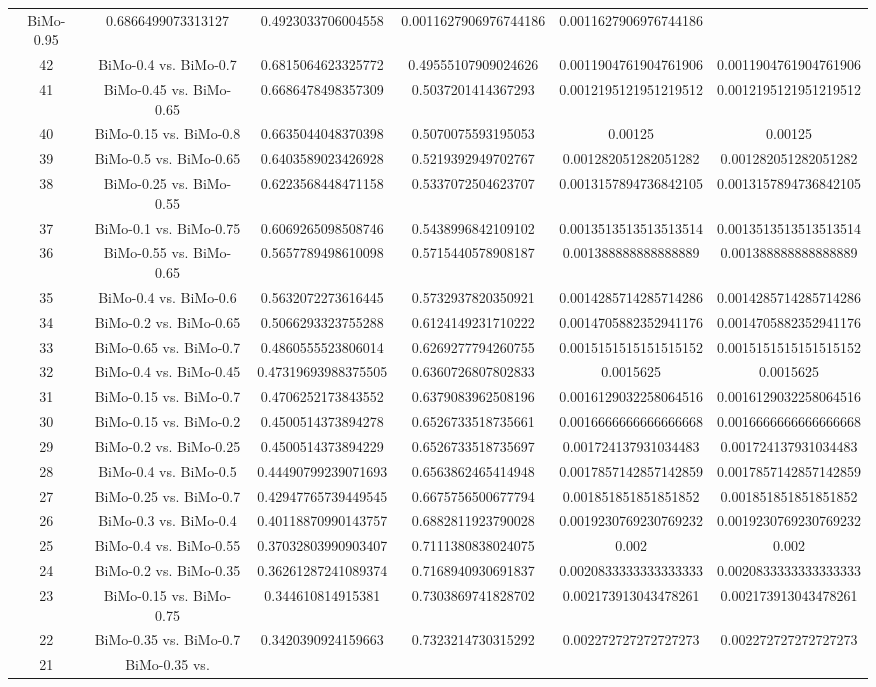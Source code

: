 \documentclass[a4paper,10pt]{article}
\begin{document}
\begin{landscape}
\begin{table}[!htp]
\begin{tabular}{cccccc}
BiMo-0.95&0.6866499073313127&0.4923033706004558&0.0011627906976744186&0.0011627906976744186\\42&BiMo-0.4 vs. BiMo-0.7&0.6815064623325772&0.49555107909024626&0.0011904761904761906&0.0011904761904761906\\41&BiMo-0.45 vs. BiMo-0.65&0.6686478498357309&0.5037201414367293&0.0012195121951219512&0.0012195121951219512\\40&BiMo-0.15 vs. BiMo-0.8&0.6635044048370398&0.5070075593195053&0.00125&0.00125\\39&BiMo-0.5 vs. BiMo-0.65&0.6403589023426928&0.5219392949702767&0.001282051282051282&0.001282051282051282\\38&BiMo-0.25 vs. BiMo-0.55&0.6223568448471158&0.5337072504623707&0.0013157894736842105&0.0013157894736842105\\37&BiMo-0.1 vs. BiMo-0.75&0.6069265098508746&0.5438996842109102&0.0013513513513513514&0.0013513513513513514\\36&BiMo-0.55 vs. BiMo-0.65&0.5657789498610098&0.5715440578908187&0.001388888888888889&0.001388888888888889\\35&BiMo-0.4 vs. BiMo-0.6&0.5632072273616445&0.5732937820350921&0.0014285714285714286&0.0014285714285714286\\34&BiMo-0.2 vs. BiMo-0.65&0.5066293323755288&0.6124149231710222&0.0014705882352941176&0.0014705882352941176\\33&BiMo-0.65 vs. BiMo-0.7&0.4860555523806014&0.6269277794260755&0.0015151515151515152&0.0015151515151515152\\32&BiMo-0.4 vs. BiMo-0.45&0.47319693988375505&0.6360726807802833&0.0015625&0.0015625\\31&BiMo-0.15 vs. BiMo-0.7&0.4706252173843552&0.6379083962508196&0.0016129032258064516&0.0016129032258064516\\30&BiMo-0.15 vs. BiMo-0.2&0.4500514373894278&0.6526733518735661&0.0016666666666666668&0.0016666666666666668\\29&BiMo-0.2 vs. BiMo-0.25&0.4500514373894229&0.6526733518735697&0.001724137931034483&0.001724137931034483\\28&BiMo-0.4 vs. BiMo-0.5&0.44490799239071693&0.6563862465414948&0.0017857142857142859&0.0017857142857142859\\27&BiMo-0.25 vs. BiMo-0.7&0.42947765739449545&0.6675756500677794&0.001851851851851852&0.001851851851851852\\26&BiMo-0.3 vs. BiMo-0.4&0.40118870990143757&0.6882811923790028&0.0019230769230769232&0.0019230769230769232\\25&BiMo-0.4 vs. BiMo-0.55&0.37032803990903407&0.7111380838024075&0.002&0.002\\24&BiMo-0.2 vs. BiMo-0.35&0.36261287241089374&0.7168940930691837&0.0020833333333333333&0.0020833333333333333\\23&BiMo-0.15 vs. BiMo-0.75&0.344610814915381&0.7303869741828702&0.002173913043478261&0.002173913043478261\\22&BiMo-0.35 vs. BiMo-0.7&0.3420390924159663&0.7323214730315292&0.002272727272727273&0.002272727272727273\\21&BiMo-0.35 vs. 
\end{tabular}
\end{table}
\end{landscape}
\end{document}
